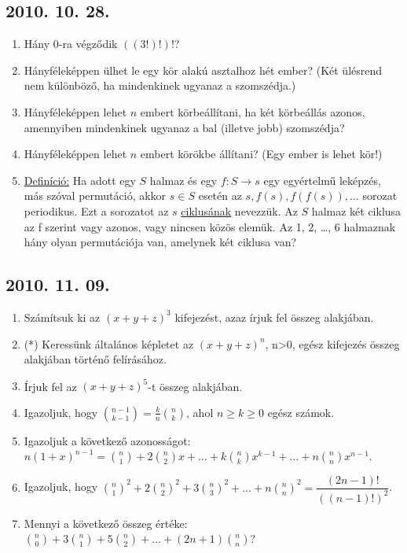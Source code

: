 \subsection*{2010. 10. 28.}
\begin{enumerate}
\item Hány $0$-ra végződik $((3!)!)!$?
\item Hányféleképpen ülhet le egy kör alakú asztalhoz hét ember? (Két ülésrend nem különböző, ha mindenkinek ugyanaz a szomszédja.)
\item Hányféleképpen lehet $n$ embert körbeállítani, ha két körbeállás azonos, amennyiben mindenkinek ugyanaz a bal (illetve jobb) szomszédja?
\item Hányféleképpen lehet $n$ embert körökbe állítani? (Egy ember is lehet kör!)
\item \underline{Definíció:} Ha adott egy $S$ halmaz és egy $f: S\rightarrow{s}$ egy egyértelmű leképzés, más szóval permutáció, akkor $s{\in}S$ esetén az $s, f(s), f(f(s)),\dots$ sorozat periodikus. Ezt a sorozatot az $s$ \underline{ciklusának} nevezzük. Az $S$ halmaz két ciklusa az f szerint  vagy azonos, vagy nincsen közös elemük. Az {{1, 2, \dots, 6}} halmaznak hány olyan permutációja van, amelynek két ciklusa van?
\end{enumerate}


\subsection*{2010. 11. 09.}
\begin{enumerate}
\item Számítsuk ki az $(x+y+z)^{3}$ kifejezést, azaz írjuk fel összeg alakjában.
\item (*) Keressünk általános képletet az $(x+y+z)^{n}$, n>0, egész kifejezés összeg alakjában történő felírásához.
\item Írjuk fel az $(x+y+z)^{5}$-t összeg alakjában.
\item Igazoljuk, hogy $\binom{n-1}{k-1}=\frac{k}{n}\binom{n}{k} $, ahol $n\ge{k}\ge{0}$ egész számok.
\item Igazoljuk a következő azonosságot: $n(1+x)^{n-1} = \binom{n}{1}+2\binom{n}{2}x+\dots+k\binom{n}{k}x^{k-1}+\dots+n\binom{n}{n}x^{n-1}$.
\item Igazoljuk, hogy ${\binom{n}{1}}^{2}+2{\binom{n}{2}}^{2}+3{\binom{n}{3}}^{2}+\dots+n{\binom{n}{n}}^{2}=\dfrac{(2n-1)!}{((n-1)!)^{2}}$.
\item Mennyi a következő összeg értéke: $\binom{n}{0}+3\binom{n}{1}+5\binom{n}{2}+\dots+(2n+1)\binom{n}{n}$?
\end{enumerate}


